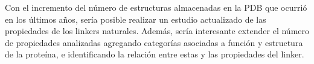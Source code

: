 Con el incremento del número de estructuras almacenadas en la PDB que ocurrió en los últimos años, sería posible realizar un estudio actualizado de las propiedades de los linkers naturales.
Además, sería interesante extender el número de propiedades analizadas agregando categorías asociadas a función y estructura de la proteína, e identificando la relación entre estas y las propiedades del linker.


% 
% 
% 
% 
% 







